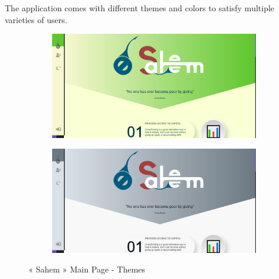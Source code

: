 The application comes with different themes and colors to satisfy multiple varieties of users.
\begin{figure}
      \centering
      \begin{subfigure}[H]{0.45\textwidth}
          \centering
          \includegraphics[width=\textwidth]{assets/screen-main-gre.png}
      \end{subfigure}
      \hfill
      \begin{subfigure}[H]{0.45\textwidth}
          \centering
          \includegraphics[width=\textwidth]{assets/screen-main-grey.png}
      \end{subfigure}
      \caption{« Sahem » Main Page - Themes}
      
 \end{figure}

